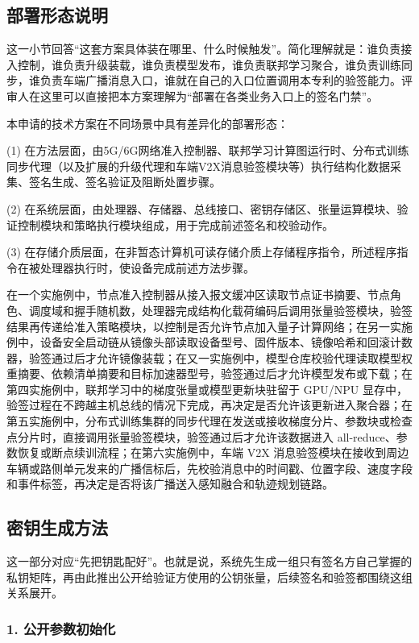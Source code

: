 \documentclass[12pt,a4paper]{article}
\begin{document}
\subsection{部署形态说明}

这一小节回答“这套方案具体装在哪里、什么时候触发”。简化理解就是：谁负责接入控制，谁负责升级装载，谁负责模型发布，谁负责联邦学习聚合，谁负责训练同步，谁负责车端广播消息入口，谁就在自己的入口位置调用本专利的验签能力。评审人在这里可以直接把本方案理解为“部署在各类业务入口上的签名门禁”。

本申请的技术方案在不同场景中具有差异化的部署形态：

(1) 在方法层面，由5G/6G网络准入控制器、联邦学习计算图运行时、分布式训练同步代理（以及扩展的升级代理和车端V2X消息验签模块等）执行结构化数据采集、签名生成、签名验证及阻断处置步骤。

(2) 在系统层面，由处理器、存储器、总线接口、密钥存储区、张量运算模块、验证控制模块和策略执行模块组成，用于完成前述签名和校验动作。

(3) 在存储介质层面，在非暂态计算机可读存储介质上存储程序指令，所述程序指令在被处理器执行时，使设备完成前述方法步骤。

在一个实施例中，节点准入控制器从接入报文缓冲区读取节点证书摘要、节点角色、调度域和握手随机数，处理器完成结构化载荷编码后调用张量验签模块，验签结果再传递给准入策略模块，以控制是否允许节点加入量子计算网络；在另一实施例中，设备安全启动链从镜像头部读取设备型号、固件版本、镜像哈希和回滚计数器，验签通过后才允许镜像装载；在又一实施例中，模型仓库校验代理读取模型权重摘要、依赖清单摘要和目标加速器型号，验签通过后才允许模型发布或下载；在第四实施例中，联邦学习中的梯度张量或模型更新块驻留于 GPU/NPU 显存中，验签过程在不跨越主机总线的情况下完成，再决定是否允许该更新进入聚合器；在第五实施例中，分布式训练集群的同步代理在发送或接收梯度分片、参数块或检查点分片时，直接调用张量验签模块，验签通过后才允许该数据进入 all-reduce、参数恢复或断点续训流程；在第六实施例中，车端 V2X 消息验签模块在接收到周边车辆或路侧单元发来的广播信标后，先校验消息中的时间戳、位置字段、速度字段和事件标签，再决定是否将该广播送入感知融合和轨迹规划链路。

\subsection{密钥生成方法}

这一部分对应“先把钥匙配好”。也就是说，系统先生成一组只有签名方自己掌握的私钥矩阵，再由此推出公开给验证方使用的公钥张量，后续签名和验签都围绕这组关系展开。

\subsubsection{1. 公开参数初始化}
\end{document}
